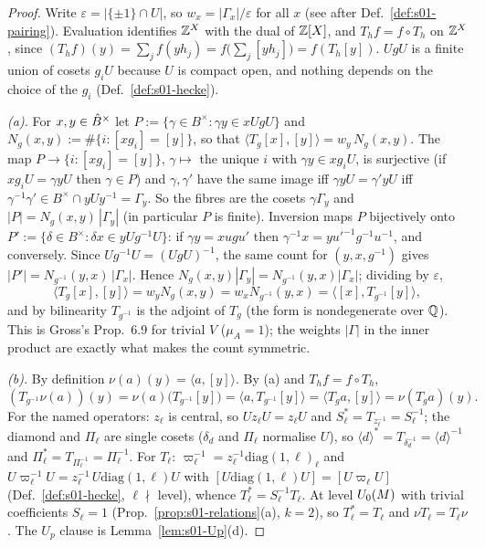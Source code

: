 \begin{proof}
Write $\varepsilon=|\{\pm1\}\cap U|$, so $w_x=|\Gamma_x|/\varepsilon$ for all $x$ (see after Def.~\ref{def:s01-pairing}). Evaluation identifies $\mathbb{Z}^X$ with the dual
of $\mathbb{Z}[X]$, and $T_hf=f\circ T_h$ on $\mathbb{Z}^X$, since $(T_hf)(y)=\sum_jf(yh_j)=f\big(\sum_j[yh_j]\big)=f(T_h[y])$. $UgU$ is a finite union of cosets $g_iU$
because $U$ is compact open, and nothing depends on the choice of the $g_i$ (Def.~\ref{def:s01-hecke}).

\emph{(a).} For $x,y\in\hat{B}^\times$ let $P:=\{\gamma\in B^\times:\gamma y\in xUgU\}$ and $N_g(x,y):=\#\{i:[xg_i]=[y]\}$, so that
$\langle T_g[x],[y]\rangle=w_y\,N_g(x,y)$. The map $P\to\{i:[xg_i]=[y]\}$, $\gamma\mapsto$ the unique $i$ with $\gamma y\in xg_iU$, is surjective
(if $xg_iU=\gamma yU$ then $\gamma\in P$) and $\gamma,\gamma'$ have the same image iff $\gamma yU=\gamma'yU$ iff $\gamma^{-1}\gamma'\in B^\times\cap yUy^{-1}=\Gamma_y$.
So the fibres are the cosets $\gamma\Gamma_y$ and $|P|=N_g(x,y)\,|\Gamma_y|$ (in particular $P$ is finite). Inversion maps $P$ bijectively onto
$P':=\{\delta\in B^\times:\delta x\in yUg^{-1}U\}$: if $\gamma y=xugu'$ then $\gamma^{-1}x=yu'^{-1}g^{-1}u^{-1}$, and conversely. Since $Ug^{-1}U=(UgU)^{-1}$,
the same count for $(y,x,g^{-1})$ gives $|P'|=N_{g^{-1}}(y,x)\,|\Gamma_x|$. Hence $N_g(x,y)|\Gamma_y|=N_{g^{-1}}(y,x)|\Gamma_x|$; dividing by $\varepsilon$,
\[\langle T_g[x],[y]\rangle=w_yN_g(x,y)=w_xN_{g^{-1}}(y,x)=\langle[x],T_{g^{-1}}[y]\rangle,\]
and by bilinearity $T_{g^{-1}}$ is the adjoint of $T_g$ (the form is nondegenerate over $\mathbb{Q}$). This is Gross's Prop.~6.9 for trivial $V$ ($\mu_A=1$);
the weights $|\Gamma|$ in the inner product are exactly what makes the count symmetric.

\emph{(b).} By definition $\nu(a)(y)=\langle a,[y]\rangle$. By (a) and $T_hf=f\circ T_h$,
\[(T_{g^{-1}}\nu(a))(y)=\nu(a)\big(T_{g^{-1}}[y]\big)=\langle a,T_{g^{-1}}[y]\rangle=\langle T_ga,[y]\rangle=\nu(T_ga)(y).\]
For the named operators: $z_\ell$ is central, so $Uz_\ell U=z_\ell U$ and $S_\ell^*=T_{z_\ell^{-1}}=S_\ell^{-1}$; the diamond and $\Pi_\ell$ are single cosets ($\delta_d$ and $\Pi_\ell$
normalise $U$), so $\langle d\rangle^*=T_{\delta_d^{-1}}=\langle d\rangle^{-1}$ and $\Pi_\ell^*=T_{\Pi_\ell^{-1}}=\Pi_\ell^{-1}$. For $T_\ell$: $\varpi_\ell^{-1}=z_\ell^{-1}\mathrm{diag}(1,\ell)_\ell$
and $U\varpi_\ell^{-1}U=z_\ell^{-1}\,U\mathrm{diag}(1,\ell)U$ with $[U\mathrm{diag}(1,\ell)U]=[U\varpi_\ell U]$ (Def.~\ref{def:s01-hecke}, $\ell\nmid$ level), whence
$T_\ell^*=S_\ell^{-1}T_\ell$. At level $U_0(M)$ with trivial coefficients $S_\ell=1$ (Prop.~\ref{prop:s01-relations}(a), $k=2$), so $T_\ell^*=T_\ell$ and $\nu T_\ell=T_\ell\nu$.
The $U_p$ clause is Lemma~\ref{lem:s01-Up}(d).


\end{proof}

